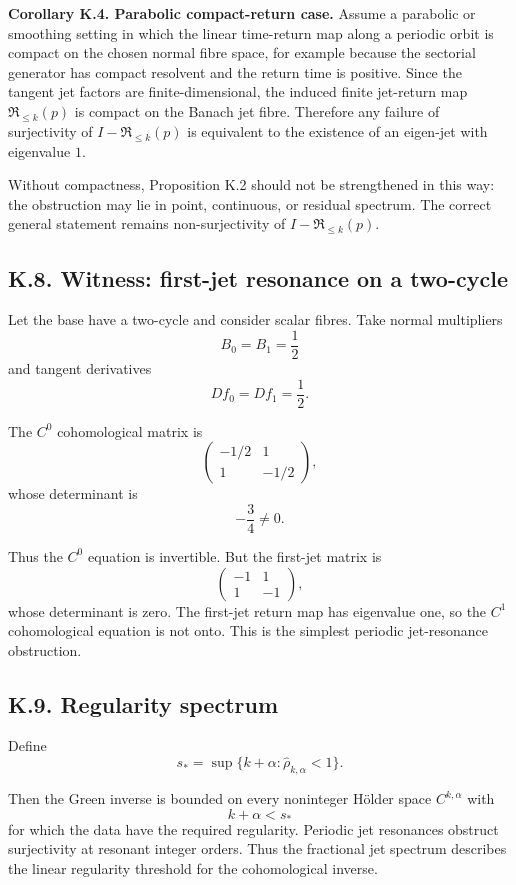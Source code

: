 \documentclass[12pt,a4paper]{article}
\theoremstyle{plain}
\numberwithin{equation}{section}
\numberwithin{theorem}{section}
\begin{document}
\textbf{Corollary K.4. Parabolic compact-return case.} Assume a parabolic or smoothing setting in which the linear time-return map along a periodic orbit is compact on the chosen normal fibre space, for example because the sectorial generator has compact resolvent and the return time is positive. Since the tangent jet factors are finite-dimensional, the induced finite jet-return map $\mathfrak R_{\le k}(p)$ is compact on the Banach jet fibre. Therefore any failure of surjectivity of $I-\mathfrak R_{\le k}(p)$ is equivalent to the existence of an eigen-jet with eigenvalue $1$.

Without compactness, Proposition K.2 should not be strengthened in this way: the obstruction may lie in point, continuous, or residual spectrum. The correct general statement remains non-surjectivity of $I-\mathfrak R_{\le k}(p)$.

\subsection{K.8. Witness: first-jet resonance on a two-cycle}

Let the base have a two-cycle and consider scalar fibres. Take normal multipliers
\[
B_0=B_1=\frac12
\]
and tangent derivatives
\[
Df_0=Df_1=\frac12.
\]

The $C^0$ cohomological matrix is
\[
\begin{pmatrix}
-1/2&1\\
1&-1/2
\end{pmatrix},
\]
whose determinant is
\[
-\frac34\ne0.
\]

Thus the $C^0$ equation is invertible. But the first-jet matrix is
\[
\begin{pmatrix}
-1&1\\
1&-1
\end{pmatrix},
\]
whose determinant is zero. The first-jet return map has eigenvalue one, so the $C^1$ cohomological equation is not onto. This is the simplest periodic jet-resonance obstruction.

\subsection{K.9. Regularity spectrum}

Define
\[
s_*=\sup\{k+\alpha:
\widehat\rho_{k,\alpha}<1\}.
\tag{K.9.1}
\]

Then the Green inverse is bounded on every noninteger H\"older space $C^{k,\alpha}$ with
\[
k+\alpha<s_*
\]
for which the data have the required regularity. Periodic jet resonances obstruct surjectivity at resonant integer orders. Thus the fractional jet spectrum describes the linear regularity threshold for the cohomological inverse.
\end{document}
